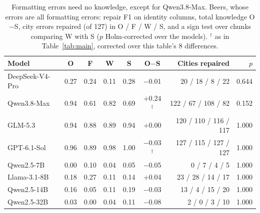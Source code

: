 \begin{table}[t]
  \caption{Formatting errors need no knowledge, except for Qwen3.8-Max. Beers, whose errors are all formatting
  errors: repair F1 on identity columns, total knowledge O$-$S, city
  errors repaired (of 127) in O / F / W / S, and a sign test over chunks comparing W with S ($p$ Holm-corrected over the
  models). $^\dagger$ as in Table~\ref{tab:main}, corrected over this table's 8 differences.}
  \label{tab:beers}
  \small
  \setlength{\tabcolsep}{2.5pt}
  \begin{tabular}{@{}lcccccrr@{}}
    \toprule
    Model & O & F & W & S & O$-$S & Cities repaired & $p$ \\
    \midrule
    DeepSeek-V4-Pro & 0.27 & 0.24 & 0.11 & 0.28 & $-$0.01 & 20 / 18 / 8 / 22 & 0.644 \\
    Qwen3.8-Max & 0.94 & 0.61 & 0.82 & 0.69 & +0.24$^\dagger$ & 122 / 67 / 108 / 82 & 0.152 \\
    GLM-5.3 & 0.94 & 0.88 & 0.89 & 0.94 & +0.00 & 120 / 110 / 116 / 117 & 1.000 \\
    GPT-6.1-Sol & 0.96 & 0.89 & 0.98 & 1.00 & $-$0.03$^\dagger$ & 127 / 115 / 127 / 127 & 1.000 \\
    Qwen2.5-7B & 0.00 & 0.10 & 0.04 & 0.05 & $-$0.05 & 0 / 7 / 4 / 5 & 1.000 \\
    Llama-3.1-8B & 0.18 & 0.27 & 0.11 & 0.14 & +0.04 & 23 / 28 / 14 / 17 & 1.000 \\
    Qwen2.5-14B & 0.16 & 0.05 & 0.11 & 0.19 & $-$0.03 & 13 / 4 / 15 / 20 & 1.000 \\
    Qwen2.5-32B & 0.03 & 0.00 & 0.04 & 0.11 & $-$0.08 & 2 / 0 / 3 / 10 & 1.000 \\
    \bottomrule
  \end{tabular}
\end{table}
